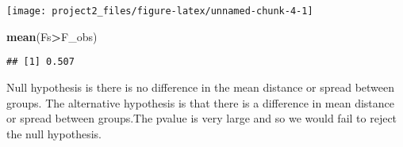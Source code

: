 \documentclass[]{article}
\newenvironment{Shaded}{\begin{snugshade}}{\end{snugshade}}
\newcommand{\CommentTok}[1]{\textcolor[rgb]{0.56,0.35,0.01}{\textit{#1}}}
\newcommand{\DataTypeTok}[1]{\textcolor[rgb]{0.13,0.29,0.53}{#1}}
\newcommand{\KeywordTok}[1]{\textcolor[rgb]{0.13,0.29,0.53}{\textbf{#1}}}
\newcommand{\NormalTok}[1]{#1}
\newcommand{\OperatorTok}[1]{\textcolor[rgb]{0.81,0.36,0.00}{\textbf{#1}}}
\newcommand{\StringTok}[1]{\textcolor[rgb]{0.31,0.60,0.02}{#1}}
\begin{document}
\begin{center}\texttt{[image: project2\_files/figure-latex/unnamed-chunk-4-1]} \end{center}

\begin{Shaded}
\begin{Highlighting}[]
\KeywordTok{mean}\NormalTok{(Fs}\OperatorTok{>}\NormalTok{F_obs)}
\end{Highlighting}
\end{Shaded}

\begin{verbatim}
## [1] 0.507
\end{verbatim}

Null hypothesis is there is no difference in the mean distance or spread
between groups. The alternative hypothesis is that there is a difference
in mean distance or spread between groups.The pvalue is very large and
so we would fail to reject the null hypothesis.

\begin{Shaded}
\end{Shaded}
\end{document}
